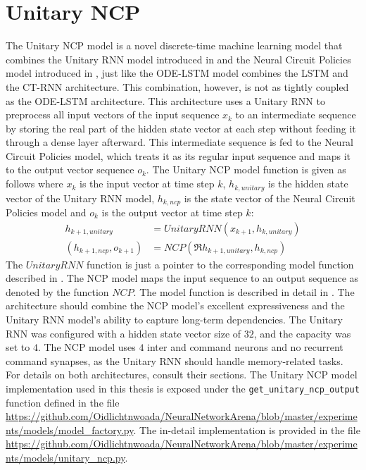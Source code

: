 \documentclass[draft,final]{vutinfth} %
\begin{document}
    \section{Unitary NCP} \label{uncp}
    The Unitary NCP model is a novel discrete-time machine learning model that combines the Unitary RNN model introduced in  and the Neural Circuit Policies model introduced in , just like the ODE-LSTM model combines the LSTM and the CT-RNN architecture.
    This combination, however, is not as tightly coupled as the ODE-LSTM architecture.
    This architecture uses a Unitary RNN to preprocess all input vectors of the input sequence $x_k$ to an intermediate sequence by storing the real part of the hidden state vector at each step without feeding it through a dense layer afterward.
    This intermediate sequence is fed to the Neural Circuit Policies model, which treats it as its regular input sequence and maps it to the output vector sequence $o_k$.
    The Unitary NCP model function is given as follows where $x_k$ is the input vector at time step $k$, $h_{k,unitary}$ is the hidden state vector of the Unitary RNN model, $h_{k,ncp}$ is the state vector of the Neural Circuit Policies model and $o_k$ is the output vector at time step $k$:
    \begin{align}
        h_{k+1,unitary} &= UnitaryRNN(x_{k+1}, h_{k,unitary}) \\
        (h_{k+1,ncp}, o_{k+1}) &= NCP(\Re{h_{k+1,unitary}}, h_{k,ncp})
    \end{align}
    The $UnitaryRNN$ function is just a pointer to the corresponding model function described in .
    The NCP model maps the input sequence to an output sequence as denoted by the function $NCP$. The model function is described in detail in .
    The architecture should combine the NCP model's excellent expressiveness and the Unitary RNN model's ability to capture long-term dependencies.
    The Unitary RNN was configured with a hidden state vector size of $32$, and the capacity was set to $4$.
    The NCP model uses $4$ inter and command neurons and no recurrent command synapses, as the Unitary RNN should handle memory-related tasks.
    For details on both architectures, consult their sections.
    The Unitary NCP model implementation used in this thesis is exposed under the \texttt{get\_unitary\_ncp\_output} function defined in the file \url{https://github.com/Oidlichtnwoada/NeuralNetworkArena/blob/master/experiments/models/model_factory.py}.
    The in-detail implementation is provided in the file \url{https://github.com/Oidlichtnwoada/NeuralNetworkArena/blob/master/experiments/models/unitary_ncp.py}.
\end{document}
